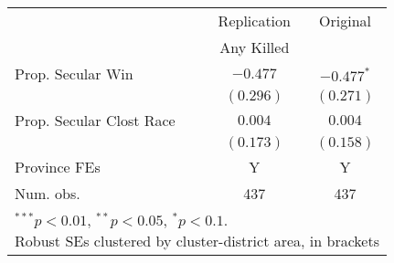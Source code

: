 
\begin{tabular}{l c c}
\hline
 & Replication & Original \\
& Any Killed & \\
\hline
Prop. Secular Win        & $-0.477$  & $-0.477^{*}$\\
                         & $(0.296)$ & $(0.271)$\\
Prop. Secular Clost Race & $0.004$   & $0.004$\\
                         & $(0.173)$ & $(0.158)$\\
\hline
Province FEs             & Y               & Y\\
Num. obs.                & 437             & 437\\
\hline
\multicolumn{3}{l}{\scriptsize{\parbox{.4\linewidth}{\vspace{2pt}$^{***}p<0.01$, $^{**}p<0.05$, $^*p<0.1$. \\
      Robust SEs clustered by cluster-district area, in brackets\\}}}
\end{tabular}
